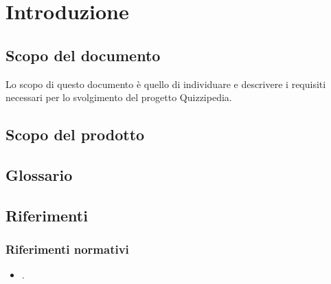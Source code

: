\documentclass[a4paper, titlepage]{article}
\begin{document}
\pagestyle{fancy}	

\maketitle



\newpage
\tableofcontents

\newpage
\listoffigures

\newpage
\listoftables\label{lastromanpage}

\newpage
\clearpage	
{}

\section{Introduzione}
\subsection{Scopo del documento}
Lo scopo di questo documento è quello di individuare e descrivere i requisiti necessari per lo svolgimento del progetto Quizzipedia.

\subsection{Scopo del prodotto}
\SCOPO

\subsection{Glossario}
\GLOSSARIO

\subsection{Riferimenti}
\subsubsection{Riferimenti normativi}
\begin{itemize}
\item {} \NdPdoc.
\end{itemize}
\end{document}

